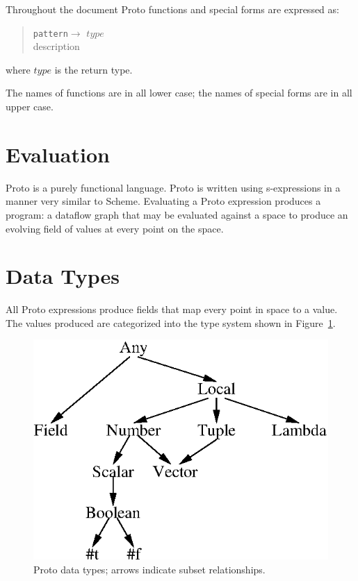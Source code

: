 \documentclass{article}
\newcommand\function[3]
{\begin{quote}{\tt #1}$\rightarrow$ \type{#2} \\ #3 \end{quote}}
\newcommand\type[1]{$#1$}
\begin{document}
Throughout the document Proto functions and special forms are
expressed as: 
\function{pattern}{type}{description}
where \type{type} is the return type.

The names of functions are in all lower case; the names of special
forms are in all upper case.


\section{Evaluation}

Proto is a purely functional language.  Proto is written using
s-expressions in a manner very similar to Scheme.  Evaluating a Proto
expression produces a program: a dataflow graph that may be evaluated
against a space to produce an evolving field of values at every point
on the space.


\section{Data Types}

All Proto expressions produce fields that map every point in space to
a value.  The values produced are categorized into the type system
shown in Figure~\ref{f:types}.

\begin{figure}[hp]
\centering
\includegraphics{figures/types.eps}
\caption{Proto data types; arrows indicate subset relationships.}
\label{f:types}
\end{figure}
\end{document}
